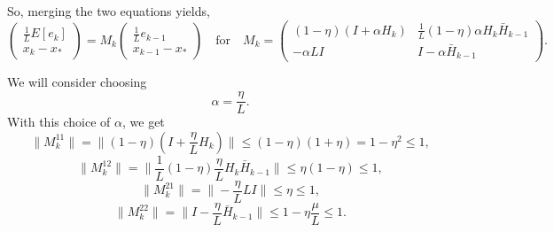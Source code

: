 \documentclass{article}
\begin{document}
\bigskip

\noindent  
So, merging the two equations yields,
\[
 \begin{pmatrix} \displaystyle\frac{1}{L}E[e_k] \\ x_k-x_\ast \end{pmatrix} 
= M_k
 \begin{pmatrix} \displaystyle\frac{1}{L}e_{k-1} \\ x_{k-1}-x_\ast \end{pmatrix}  \quad\mbox{for}\quad 
 M_k = \begin{pmatrix} (1-\eta)(I+\alpha H_k) & \displaystyle\frac{1}{L} (1-\eta)\alpha H_k\bar H_{k-1}\\  
                   -\alpha LI  & I-\alpha\bar H_{k-1} \end{pmatrix}.                   
\]

\bigskip
\noindent
We will consider choosing 
\[
 \alpha = \frac{\eta}{L}.
\]
With this choice of $\alpha$, we get
\[
 \|M_k^{11}\|= \|(1-\eta)(I+\frac{\eta}{L}H_k)\|\leq (1-\eta)(1+\eta) = 1-\eta^2 \leq 1,
\]
\[
 \|M_k^{12}\|= \|\frac{1}{L} (1-\eta)\frac{\eta}{L} H_k\bar H_{k-1}\|\leq \eta(1-\eta)\leq 1,
\]
\[
 \|M_k^{21}\|= \|-\frac{\eta}{L} LI \|\leq \eta \leq 1,
\]
\[
 \|M_k^{22}\|= \|I-\frac{\eta}{L}\bar H_{k-1} \|\leq 1-\eta\frac{\mu}{L} \leq 1.
\]
\end{document}
